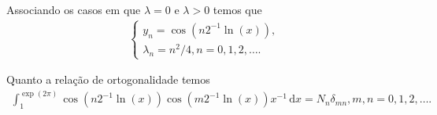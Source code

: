 \documentclass[a4paper,12pt, leqno, answers]{exam}
\begin{document}
\begin{questions}
\begin{solution}
        Associando os casos em que $\lambda = 0$ e $\lambda > 0$ temos que
        \begin{align*}
            \begin{cases}
                y_n = \cos\left( n 2^{-1} \ln(x) \right), \\
                \lambda_n = n^2 / 4, n = 0, 1, 2, \ldots.
            \end{cases}
        \end{align*}

        Quanto a rela\c{c}\~{a}o de ortogonalidade temos
        \begin{align*}
            \int_1^{\exp(2\pi)} \cos(n 2^{-1} \ln(x)) \cos(m 2^{-1} \ln(x)) x^{-1} \,\mathrm{d}x = N_n \delta_{mn}, m, n = 0, 1, 2, \ldots.
        \end{align*}
    \end{solution}
\end{questions}


\end{document}
